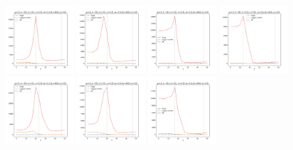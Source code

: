 \documentclass[a4paper]{article}
\begin{document}
\begin{figure}[H]
  \centering
  \includegraphics[width=0.23\textwidth]{grid-g2-v1-w1_0}
  \includegraphics[width=0.23\textwidth]{grid-g2-v1-w2_0}
  \includegraphics[width=0.23\textwidth]{grid-g2-v1-w3_0}
  \includegraphics[width=0.23\textwidth]{grid-g2-v1-w4_0}
  \\
  \includegraphics[width=0.23\textwidth]{grid-g2-v2-w1_0}
  \includegraphics[width=0.23\textwidth]{grid-g2-v2-w2_0}
  \includegraphics[width=0.23\textwidth]{grid-g2-v2-w3_0}

\end{figure}
\end{document}
